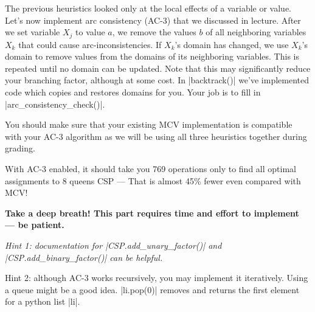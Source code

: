 \item {}
The previous heuristics looked only at the local effects of a variable or value.
Let's now implement arc consistency (AC-3) that we discussed in lecture. After
we set variable $X_j$ to value $a$, we remove the values $b$ of all neighboring
variables $X_k$ that could cause arc-inconsistencies. If $X_k$'s domain has
changed, we use $X_k$'s domain to remove values from the domains of its
neighboring variables. This is repeated until no domain can be updated. Note
that this may significantly reduce your branching factor, although at some cost.
In |backtrack()| we've implemented code which copies and restores domains for
you. Your job is to fill in |arc_consistency_check()|.

You should make sure that your existing MCV implementation is compatible with
your AC-3 algorithm as we will be using all three heuristics together during
grading.

With AC-3 enabled, it should take you 769 operations only to find all optimal
assignments to 8 queens CSP --- That is almost 45\% fewer even compared with
MCV!

{\bf Take a deep breath! This part requires time and effort to implement --- be
patient.}

{\em Hint 1: documentation for |CSP.add_unary_factor()| and
|CSP.add_binary_factor()| can be helpful.

Hint 2: although AC-3 works recursively, you may implement it iteratively. Using
a queue might be a good idea. |li.pop(0)| removes and returns the first element
for a python list |li|.}
